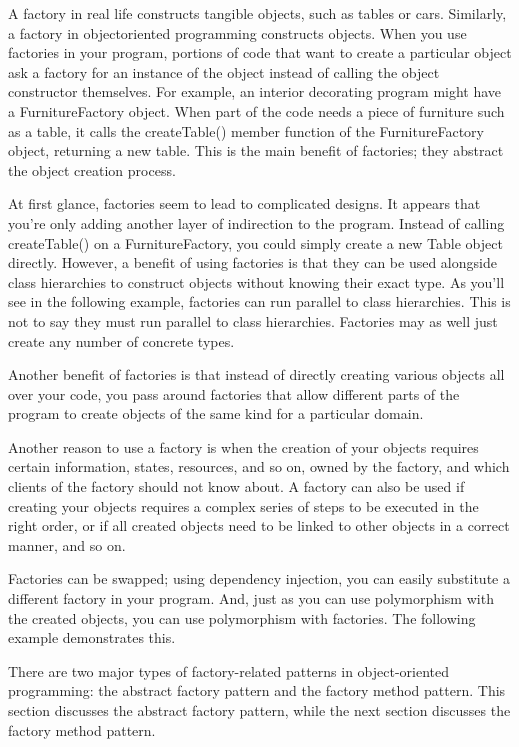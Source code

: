 
A factory in real life constructs tangible objects, such as tables or cars. Similarly, a factory in objectoriented programming constructs objects. When you use factories in your program, portions of code that want to create a particular object ask a factory for an instance of the object instead of calling the object constructor themselves. For example, an interior decorating program might have a FurnitureFactory object. When part of the code needs a piece of furniture such as a table, it calls the createTable() member function of the FurnitureFactory object, returning a new table. This is the main benefit of factories; they abstract the object creation process.

At first glance, factories seem to lead to complicated designs. It appears that you’re only adding another layer of indirection to the program. Instead of calling createTable() on a FurnitureFactory, you could simply create a new Table object directly. However, a benefit of using factories is that they can be used alongside class hierarchies to construct objects without knowing their exact type. As you’ll see in the following example, factories can run parallel to class hierarchies. This is not to say they must run parallel to class hierarchies. Factories may as well just create any number of concrete types.

Another benefit of factories is that instead of directly creating various objects all over your code, you pass around factories that allow different parts of the program to create objects of the same kind for a particular domain.

Another reason to use a factory is when the creation of your objects requires certain information, states, resources, and so on, owned by the factory, and which clients of the factory should not know about. A factory can also be used if creating your objects requires a complex series of steps to be executed in the right order, or if all created objects need to be linked to other objects in a correct manner, and so on.

Factories can be swapped; using dependency injection, you can easily substitute a different factory in your program. And, just as you can use polymorphism with the created objects, you can use polymorphism with factories. The following example demonstrates this.

There are two major types of factory-related patterns in object-oriented programming: the abstract factory pattern and the factory method pattern. This section discusses the abstract factory pattern, while the next section discusses the factory method pattern.

